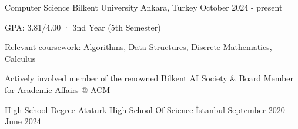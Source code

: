 

\begin{cventries}

  \cventry
    {Computer Science} %
    {Bilkent University} %
    {Ankara, Turkey} %
    {October 2024 - present} %
    {
      \begin{cvitems} %
        \item 
        {GPA: 3.81/4.00 · 3nd Year (5th Semester)
        }
        \item 
        {Relevant coursework: Algorithms, Data Structures, Discrete Mathematics, Calculus}
        \item 
        {Actively involved member of the renowned Bilkent AI Society \& Board Member for Academic Affairs @ ACM}
      \end{cvitems}
    }

  \cventry
    {High School Degree} %
    {Ataturk High School Of Science} %
    {İstanbul} %
    {September 2020 - June 2024} %
    {
    }


\end{cventries}
